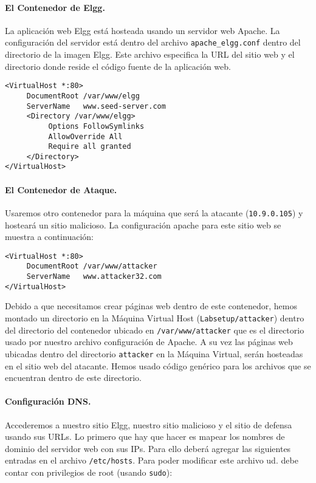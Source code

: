 \vspace{0.1in}
\paragraph{El Contenedor de Elgg.}
La aplicación web Elgg está hosteada usando un servidor web Apache.
La configuración del servidor está dentro del archivo \texttt{apache\_elgg.conf} dentro del directorio de la imagen Elgg.
Este archivo especifica la URL del sitio web y el directorio donde reside el código fuente de la aplicación web.

\begin{lstlisting}
<VirtualHost *:80>
     DocumentRoot /var/www/elgg
     ServerName   www.seed-server.com
     <Directory /var/www/elgg>
          Options FollowSymlinks
          AllowOverride All
          Require all granted
     </Directory>
</VirtualHost>
\end{lstlisting}

\paragraph{El Contenedor de Ataque.}
Usaremos otro contenedor para la máquina que será la atacante (\texttt{10.9.0.105}) y hosteará un sitio malicioso.
La configuración apache para este sitio web se muestra a continuación:

\begin{lstlisting}
<VirtualHost *:80>
     DocumentRoot /var/www/attacker
     ServerName   www.attacker32.com
</VirtualHost>
\end{lstlisting}
 
Debido a que necesitamos crear páginas web dentro de este contenedor, hemos montado un directorio en la Máquina Virtual Host (\texttt{Labsetup/attacker}) dentro del directorio del contenedor ubicado en \texttt{/var/www/attacker} que es el directorio usado por nuestro archivo configuración de Apache. A su vez las páginas web ubicadas dentro del directorio \texttt{attacker} en la Máquina Virtual, serán hosteadas en el sitio web del atacante. Hemos usado código genérico para los archivos que se encuentran dentro de este directorio.

\paragraph{Configuración DNS.}
Accederemos a nuestro sitio Elgg, nuestro sitio malicioso y el sitio de defensa usando sus URLs.
Lo primero que hay que hacer es mapear los nombres de dominio del servidor web con sus IPs. Para ello deberá agregar las siguientes entradas en el archivo \texttt{/etc/hosts}.
Para poder modificar este archivo ud. debe contar con privilegios de root (usando \texttt{sudo}):

